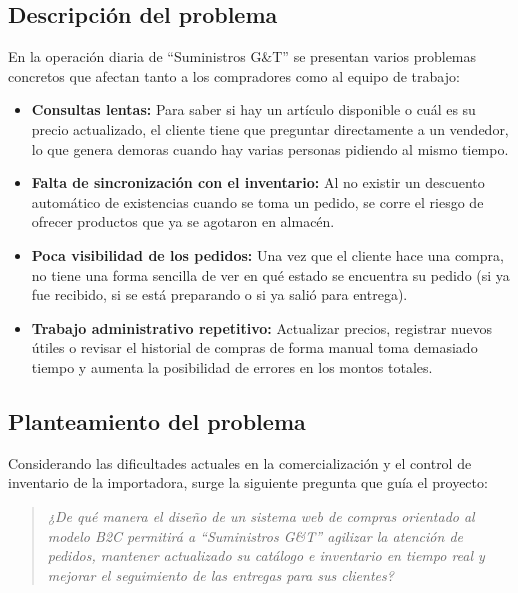 \subsection{Descripción del problema}
En la operación diaria de ``Suministros G\&T'' se presentan varios problemas concretos que afectan tanto a los compradores como al equipo de trabajo:
\begin{itemize}
    \item \textbf{Consultas lentas:} Para saber si hay un artículo disponible o cuál es su precio actualizado, el cliente tiene que preguntar directamente a un vendedor, lo que genera demoras cuando hay varias personas pidiendo al mismo tiempo.
    \item \textbf{Falta de sincronización con el inventario:} Al no existir un descuento automático de existencias cuando se toma un pedido, se corre el riesgo de ofrecer productos que ya se agotaron en almacén.
    \item \textbf{Poca visibilidad de los pedidos:} Una vez que el cliente hace una compra, no tiene una forma sencilla de ver en qué estado se encuentra su pedido (si ya fue recibido, si se está preparando o si ya salió para entrega).
    \item \textbf{Trabajo administrativo repetitivo:} Actualizar precios, registrar nuevos útiles o revisar el historial de compras de forma manual toma demasiado tiempo y aumenta la posibilidad de errores en los montos totales.
\end{itemize}

\subsection{Planteamiento del problema}
Considerando las dificultades actuales en la comercialización y el control de inventario de la importadora, surge la siguiente pregunta que guía el proyecto:

\begin{quote}
\textit{¿De qué manera el diseño de un sistema web de compras orientado al modelo B2C permitirá a ``Suministros G\&T'' agilizar la atención de pedidos, mantener actualizado su catálogo e inventario en tiempo real y mejorar el seguimiento de las entregas para sus clientes?}
\end{quote}

